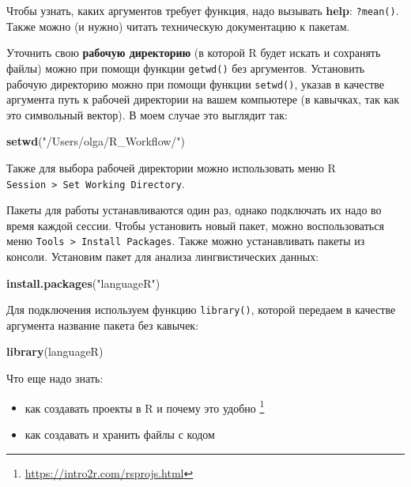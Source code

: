 \documentclass[
]{book}
\newenvironment{Shaded}{\begin{snugshade}}{\end{snugshade}}
\newcommand{\FunctionTok}[1]{\textcolor[rgb]{0.13,0.29,0.53}{\textbf{#1}}}
\newcommand{\NormalTok}[1]{#1}
\newcommand{\StringTok}[1]{\textcolor[rgb]{0.31,0.60,0.02}{#1}}
\providecommand{\tightlist}{%
  \setlength{\itemsep}{0pt}\setlength{\parskip}{0pt}}
\theoremstyle{definition}
\theoremstyle{definition}
\theoremstyle{definition}
\theoremstyle{definition}
\theoremstyle{remark}
\begin{document}
Чтобы узнать, каких аргументов требует функция, надо вызывать \textbf{help}: \texttt{?mean()}. Также можно (и нужно) читать техническую документацию к пакетам.

Уточнить свою \textbf{рабочую директорию} (в которой R будет искать и сохранять файлы) можно при помощи функции \texttt{getwd()} без аргументов. Установить рабочую директорию можно при помощи функции \texttt{setwd()}, указав в качестве аргумента путь к рабочей директории на вашем компьютере (в кавычках, так как это символьный вектор). В моем случае это выглядит так:

\begin{Shaded}
\begin{Highlighting}[]
\FunctionTok{setwd}\NormalTok{(}\StringTok{"/Users/olga/R\_Workflow/"}\NormalTok{)}
\end{Highlighting}
\end{Shaded}

Также для выбора рабочей директории можно использовать меню R \texttt{Session\ \textgreater{}\ Set\ Working\ Directory}.

Пакеты для работы устанавливаются один раз, однако подключать их надо во время каждой сессии. Чтобы установить новый пакет, можно воспользоваться меню \texttt{Tools\ \textgreater{}\ Install\ Packages}. Также можно устанавливать пакеты из консоли. Установим пакет для анализа лингвистических данных:

\begin{Shaded}
\begin{Highlighting}[]
\FunctionTok{install.packages}\NormalTok{(}\StringTok{"languageR"}\NormalTok{)}
\end{Highlighting}
\end{Shaded}

Для подключения используем функцию \texttt{library()}, которой передаем в качестве аргумента название пакета без кавычек:

\begin{Shaded}
\begin{Highlighting}[]
\FunctionTok{library}\NormalTok{(languageR)}
\end{Highlighting}
\end{Shaded}

Что еще надо знать:

\begin{itemize}
\tightlist
\item
  как создавать проекты в R и почему это удобно \footnote{\url{https://intro2r.com/rsprojs.html}}
\item
  как создавать и хранить файлы с кодом
\end{itemize}
\end{document}
